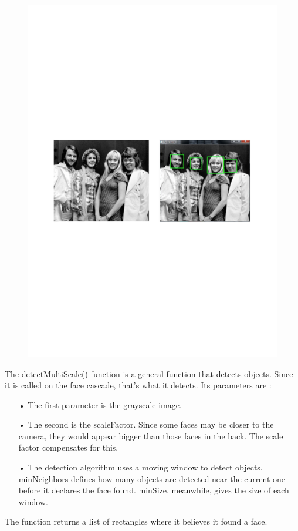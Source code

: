 \documentclass[14pt,a4paper]{article}
\begin{document}
\begin{figure}[h]
\centering
\includegraphics[scale=0.7,angle=0]{pythonFDResult.pdf}
\end{figure}
\par The detectMultiScale() function is a general function that detects objects. Since it is called on the face cascade, that’s what it detects. Its parameters are : 
\begin{enumerate}
\item[•] The first parameter is the grayscale image.
\item[•] The second is the scaleFactor. Since some faces may be closer to the camera, they would appear bigger than those faces in the back. The scale factor compensates for this.
\item[•] The detection algorithm uses a moving window to detect objects. minNeighbors defines how many objects are detected near the current one before it declares the face found. minSize, meanwhile, gives the size of each window.
\end{enumerate}
The function returns a list of rectangles where it believes it found a face.
\newpage
\end{document}
